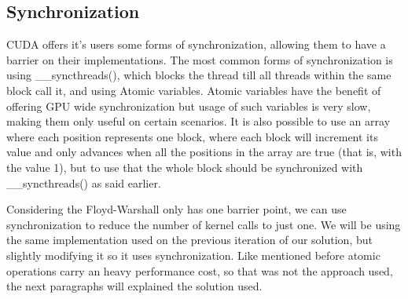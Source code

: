 \documentclass[conference]{IEEEtran}
\begin{document}

\subsection{Synchronization}

CUDA offers it's users some forms of synchronization, allowing them to have a barrier on their implementations.
The most common forms of synchronization is using \_\_syncthreads(), which blocks the thread till all threads within the same block call it, and using Atomic variables. Atomic variables have the benefit of offering GPU wide synchronization but usage of such variables is very slow, making them only useful on certain scenarios. It is also possible to use an array where each position represents one block, where each block will increment its value and only advances when all the positions in the array are true (that is, with the value 1), but to use that the whole block should be synchronized with \_\_syncthreads() as said earlier.

Considering the Floyd-Warshall only has one barrier point, we can use synchronization to reduce the number of kernel calls to just one.
We will be using the same implementation used on the previous iteration of our solution, but slightly modifying it so it uses synchronization.
Like mentioned before atomic operations carry an heavy performance cost, so that was not the approach used, the next paragraphs will explained the solution used.
\end{document}
